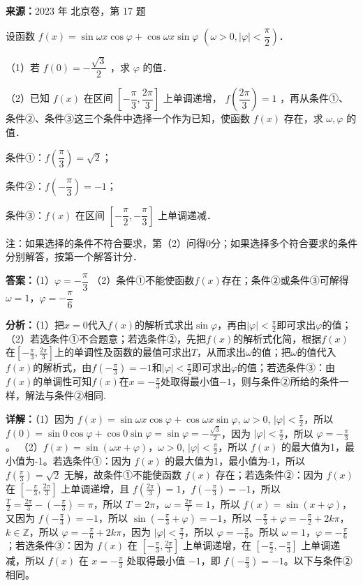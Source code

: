 \begin{question}[points=13]
\textbf{来源：}2023 年 北京卷，第 17 题\par
设函数 $f(x) = \sin\omega x\cos\varphi + \cos\omega x\sin\varphi$ $\left(\omega>0, |\varphi|<\dfrac{\pi}{2}\right)$．

（1）若 $f(0) = -\dfrac{\sqrt{3}}{2}$ ，求 $\varphi$ 的值．

（2）已知 $f(x)$ 在区间 $\left[-\dfrac{\pi}{3}, \dfrac{2\pi}{3}\right]$ 上单调递增， $f\left(\dfrac{2\pi}{3}\right)=1$ ，再从条件①、条件②、条件③这三个条件中选择一个作为已知，使函数 $f(x)$ 存在，求 $\omega, \varphi$ 的值．

条件①：$f\left(\dfrac{\pi}{3}\right)=\sqrt{2}$；

条件②：$f\left(-\dfrac{\pi}{3}\right)=-1$；

条件③：$f(x)$ 在区间 $\left[-\dfrac{\pi}{2}, -\dfrac{\pi}{3}\right]$ 上单调递减．

注：如果选择的条件不符合要求，第（2）问得0分；如果选择多个符合要求的条件分别解答，按第一个解答计分．
\begin{solution}
\textbf{答案：}（1）$\varphi=-\dfrac{\pi}{3}$ （2）条件①不能使函数$f(x)$存在；条件②或条件③可解得$\omega=1$，$\varphi=-\dfrac{\pi}{6}$

\textbf{分析：}（1）把$x=0$代入$f(x)$的解析式求出$\sin\varphi$，再由$|\varphi|<\frac{\pi}{2}$即可求出$\varphi$的值；（2）若选条件①不合题意；若选条件②，先把$f(x)$的解析式化简，根据$f(x)$在$[-\frac{\pi}{3},\frac{2\pi}{3}]$上的单调性及函数的最值可求出$T$，从而求出$\omega$的值；把$\omega$的值代入$f(x)$的解析式，由$f(-\frac{\pi}{3})=-1$和$|\varphi|<\frac{\pi}{2}$即可求出$\varphi$的值；若选条件③：由$f(x)$的单调性可知$f(x)$在$x=-\frac{\pi}{3}$处取得最小值$-1$，则与条件②所给的条件一样，解法与条件②相同.

\textbf{详解：}（1）因为 $f(x)=\sin\omega x\cos\varphi+\cos\omega x\sin\varphi$, $\omega>0$, $|\varphi|<\frac{\pi}{2}$，所以 $f(0)=\sin0\cos\varphi+\cos0\sin\varphi=\sin\varphi=-\frac{\sqrt{3}}{2}$，因为 $|\varphi|<\frac{\pi}{2}$，所以 $\varphi=-\frac{\pi}{3}$。
（2）$f(x)=\sin(\omega x+\varphi)$，$\omega>0$, $|\varphi|<\frac{\pi}{2}$，所以 $f(x)$ 的最大值为1，最小值为-1。若选条件①：因为 $f(x)$ 的最大值为1，最小值为-1，所以 $f(\frac{\pi}{3})=\sqrt{2}$ 无解，故条件①不能使函数 $f(x)$ 存在；若选条件②：因为 $f(x)$ 在 $[-\frac{\pi}{3},\frac{2\pi}{3}]$ 上单调递增，且 $f(\frac{2\pi}{3})=1$，$f(-\frac{\pi}{3})=-1$，所以 $\frac{T}{2}=\frac{2\pi}{3}-(-\frac{\pi}{3})=\pi$，所以 $T=2\pi$，$\omega=\frac{2\pi}{T}=1$，所以 $f(x)=\sin(x+\varphi)$，又因为 $f(-\frac{\pi}{3})=-1$，所以 $\sin(-\frac{\pi}{3}+\varphi)=-1$，所以 $-\frac{\pi}{3}+\varphi=-\frac{\pi}{2}+2k\pi$，$k\in\mathbb{Z}$，所以 $\varphi=-\frac{\pi}{6}+2k\pi$，因为 $|\varphi|<\frac{\pi}{2}$，所以 $\varphi=-\frac{\pi}{6}$。所以 $\omega=1$，$\varphi=-\frac{\pi}{6}$；若选条件③：因为 $f(x)$ 在 $[-\frac{\pi}{3},\frac{2\pi}{3}]$ 上单调递增，在 $[-\frac{\pi}{2},-\frac{\pi}{3}]$ 上单调递减，所以 $f(x)$ 在 $x=-\frac{\pi}{3}$ 处取得最小值 $-1$，即 $f(-\frac{\pi}{3})=-1$。以下与条件②相同。
\end{solution}
\end{question}

